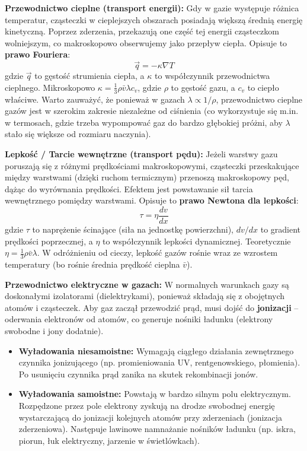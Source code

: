 \documentclass[11pt, a4paper]{article}
\begin{document}
\textbf{Przewodnictwo cieplne (transport energii):}
Gdy w gazie występuje różnica temperatur, cząsteczki w cieplejszych obszarach posiadają większą średnią energię kinetyczną. Poprzez zderzenia, przekazują one część tej energii cząsteczkom wolniejszym, co makroskopowo obserwujemy jako przepływ ciepła. Opisuje to \textbf{prawo Fouriera}:
\[
\vec{q} = -\kappa \nabla T
\]
gdzie $\vec{q}$ to gęstość strumienia ciepła, a $\kappa$ to współczynnik przewodnictwa cieplnego. Mikroskopowo $\kappa = \frac{1}{3} \rho \bar{v} \lambda c_v$, gdzie $\rho$ to gęstość gazu, a $c_v$ to ciepło właściwe. Warto zauważyć, że ponieważ w gazach $\lambda \propto 1/\rho$, przewodnictwo cieplne gazów jest w szerokim zakresie niezależne od ciśnienia (co wykorzystuje się m.in. w termosach, gdzie trzeba wypompować gaz do bardzo głębokiej próżni, aby $\lambda$ stało się większe od rozmiaru naczynia).

\textbf{Lepkość / Tarcie wewnętrzne (transport pędu):}
Jeżeli warstwy gazu poruszają się z różnymi prędkościami makroskopowymi, cząsteczki przeskakujące między warstwami (dzięki ruchom termicznym) przenoszą makroskopowy pęd, dążąc do wyrównania prędkości. Efektem jest powstawanie sił tarcia wewnętrznego pomiędzy warstwami. Opisuje to \textbf{prawo Newtona dla lepkości}:
\[
\tau = \eta \frac{dv}{dx}
\]
gdzie $\tau$ to naprężenie ścinające (siła na jednostkę powierzchni), $dv/dx$ to gradient prędkości poprzecznej, a $\eta$ to współczynnik lepkości dynamicznej. Teoretycznie $\eta = \frac{1}{3} \rho \bar{v} \lambda$. W odróżnieniu od cieczy, lepkość gazów rośnie wraz ze wzrostem temperatury (bo rośnie średnia prędkość cieplna $\bar{v}$).

\textbf{Przewodnictwo elektryczne w gazach:}
W normalnych warunkach gazy są doskonałymi izolatorami (dielektrykami), ponieważ składają się z obojętnych atomów i cząsteczek. Aby gaz zaczął przewodzić prąd, musi dojść do \textbf{jonizacji} – oderwania elektronów od atomów, co generuje nośniki ładunku (elektrony swobodne i jony dodatnie).
\begin{itemize}
    \item \textbf{Wyładowania niesamoistne:} Wymagają ciągłego działania zewnętrznego czynnika jonizującego (np. promieniowania UV, rentgenowskiego, płomienia). Po usunięciu czynnika prąd zanika na skutek rekombinacji jonów.
    \item \textbf{Wyładowania samoistne:} Powstają w bardzo silnym polu elektrycznym. Rozpędzone przez pole elektrony zyskują na drodze swobodnej energię wystarczającą do jonizacji kolejnych atomów przy zderzeniach (jonizacja zderzeniowa). Następuje lawinowe namnażanie nośników ładunku (np. iskra, piorun, łuk elektryczny, jarzenie w świetlówkach).
\end{itemize}
\end{document}
